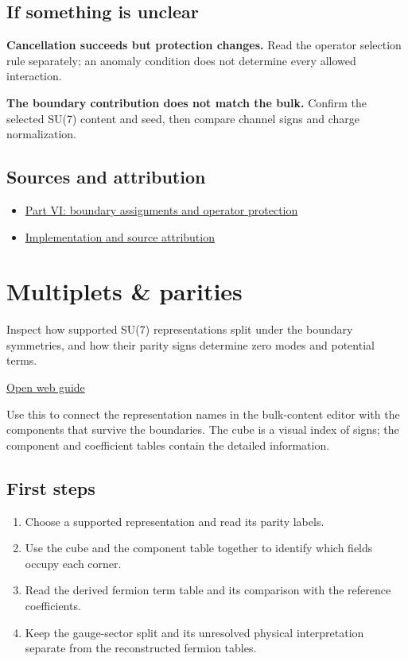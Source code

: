 \documentclass[11pt,a4paper]{article}
\begin{document}
\subsection*{If something is unclear}
\textbf{Cancellation succeeds but protection changes.} Read the operator selection rule separately; an anomaly condition does not determine every allowed interaction.

\textbf{The boundary contribution does not match the bulk.} Confirm the selected SU(7) content and seed, then compare channel signs and charge normalization.

\subsection*{Sources and attribution}
\begin{itemize}
\item \href{https://karlesmarin.github.io/ghu-explorer/papers/part-vi/index.html}{Part VI: boundary assignments and operator protection}
\item \href{https://github.com/karlesmarin/ghu-lab/blob/main/src/sections/escape_section.js}{Implementation and source attribution}
\end{itemize}
\section{Multiplets \& parities}
Inspect how supported SU(7) representations split under the boundary symmetries, and how their parity signs determine zero modes and potential terms.

\href{https://karlesmarin.github.io/ghu-explorer/guide/multiplets/index.html}{Open web guide}

Use this to connect the representation names in the bulk-content editor with the components that survive the boundaries. The cube is a visual index of signs; the component and coefficient tables contain the detailed information.
\subsection*{First steps}
\begin{enumerate}
\item Choose a supported representation and read its parity labels.
\item Use the cube and the component table together to identify which fields occupy each corner.
\item Read the derived fermion term table and its comparison with the reference coefficients.
\item Keep the gauge-sector split and its unresolved physical interpretation separate from the reconstructed fermion tables.
\end{enumerate}
\end{document}
